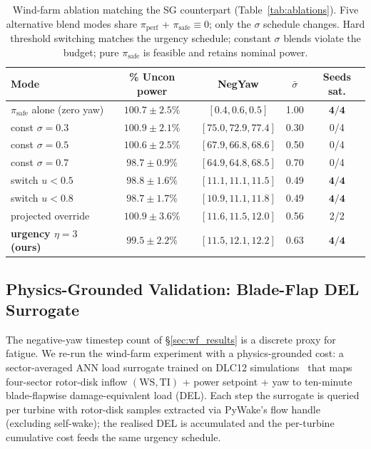 \begin{table}[h]
\centering
\caption{Wind-farm ablation matching the SG counterpart (Table~\ref{tab:ablations}). Five alternative blend modes share $\pi_{\mathrm{perf}}$ + $\pi_{\mathrm{safe}}\!\equiv\!0$; only the $\sigma$ schedule changes. Hard threshold switching matches the urgency schedule; constant $\sigma$ blends violate the budget; pure $\pi_{\mathrm{safe}}$ is feasible and retains nominal power.}
\label{tab:wf_ablation}
\begin{tabular}{lcccc}
\toprule
Mode & \% Uncon power & NegYaw & $\bar\sigma$ & Seeds sat. \\
\midrule
$\pi_{\mathrm{safe}}$ alone (zero yaw) & $100.7\!\pm\!2.5\%$ & $[0.4, 0.6, 0.5]$ & 1.00 & $\mathbf{4/4}$ \\
const $\sigma\!=\!0.3$                  & $100.9\!\pm\!2.1\%$ & $[75.0, 72.9, 77.4]$ & 0.30 & 0/4 \\
const $\sigma\!=\!0.5$                  & $100.6\!\pm\!2.5\%$ & $[67.9, 66.8, 68.6]$ & 0.50 & 0/4 \\
const $\sigma\!=\!0.7$                  & $98.7\!\pm\!0.9\%$  & $[64.9, 64.8, 68.5]$ & 0.70 & 0/4 \\
switch $u\!<\!0.5$                      & $98.8\!\pm\!1.6\%$  & $[11.1, 11.1, 11.5]$ & 0.49 & $\mathbf{4/4}$ \\
switch $u\!<\!0.8$                      & $98.7\!\pm\!1.7\%$  & $[10.9, 11.1, 11.8]$ & 0.49 & $\mathbf{4/4}$ \\
projected override                      & $100.9\!\pm\!3.6\%$ & $[11.6, 11.5, 12.0]$ & 0.56 & 2/2 \\
\textbf{urgency $\eta\!=\!3$ (ours)}    & $99.5\!\pm\!2.2\%$  & $[11.5, 12.1, 12.2]$ & 0.63 & $\mathbf{4/4}$ \\
\bottomrule
\end{tabular}
\end{table}

\subsection{Physics-Grounded Validation: Blade-Flap DEL Surrogate}
\label{sec:flap_del}

The negative-yaw timestep count of \S\ref{sec:wf_results} is a discrete proxy for fatigue.
We re-run the wind-farm experiment with a physics-grounded cost: a sector-averaged ANN load surrogate trained on DLC12 simulations~\citep{guillore2024sectoravg} that maps four-sector rotor-disk inflow $(\mathrm{WS}, \mathrm{TI})$ + power setpoint + yaw to ten-minute blade-flapwise damage-equivalent load (DEL).
Each step the surrogate is queried per turbine with rotor-disk samples extracted via PyWake's flow handle (excluding self-wake); the realised DEL is accumulated and the per-turbine cumulative cost feeds the same urgency schedule.

